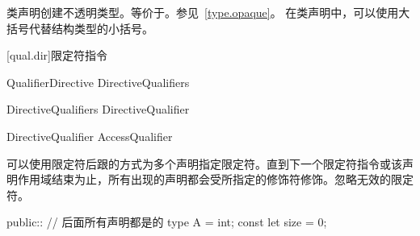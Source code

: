 \pnum
类声明创建不透明类型。等价于。参见~\ref{type.opaque}。
在类声明中，可以使用大括号代替结构类型的小括号。

[qual.dir]{限定符指令}

\begin{bnf}{QualifierDirective}
    DirectiveQualifiers \terminal{::}
\end{bnf}

\begin{bnf}{DirectiveQualifiers}
    DirectiveQualifier\bnfp
\end{bnf}

\begin{bnf}{DirectiveQualifier}
    AccessQualifier
\end{bnf}

\pnum
可以使用限定符后跟\tcode{::}的方式为多个声明指定限定符。直到下一个限定符指令或该声明作用域结束为止，所有出现的声明都会受所指定的修饰符修饰。忽略无效的限定符。

\enterexample
\begin{codeblock}
public:: // 后面所有声明都是的
type A = int;
const let size = 0;
\end{codeblock}